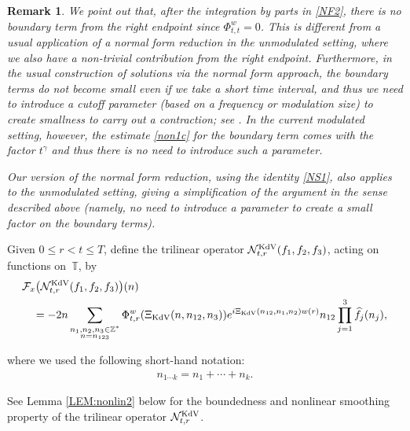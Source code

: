 \documentclass[letterpaper, 11pt,  reqno]{amsart}
\newtheorem{remark}[theorem]{Remark}
\newcommand{\1}{\hspace{0.5mm}\text{I}\hspace{0.5mm}}
\newcommand{\noi}{\noindent}
\newcommand{\Z}{\mathbb{Z}}
\newcommand{\T}{\mathbb{T}}
\newcommand{\F}{\mathcal{F}}
\newcommand{\g}{\gamma}
\newcommand{\ft}{\widehat}
\newcommand{\NN}{\mathcal{N}}
\newcommand{\KDV}{\text{\rm KdV} }
\numberwithin{equation}{section}
\numberwithin{theorem}{section}
\begin{document}
\begin{remark}\label{REM:NFx}
\rm
We point out 
that, after the integration by parts in \eqref{NF2},  there is 
no boundary term from the right endpoint  since $\Phi^w_{t, t} = 0$.
This  is different from a usual 
application of a
normal form reduction in the unmodulated setting, 
where we also have a non-trivial contribution from 
the right endpoint.
Furthermore, 
in the usual construction of solutions via the normal form approach, 
the boundary terms do not become small even if we take
a short time interval, 
and thus we need to introduce a cutoff parameter
(based on a frequency or modulation size)
to create smallness to carry out a contraction;
see \cite{BIT, KO, GKO}.
In the current modulated setting, however, 
the estimate \eqref{non1c} for the boundary term comes with the factor $t^\g$
and thus there is no need to introduce such a parameter.


Our version of the normal form reduction, 
using the identity \eqref{NS1}, 
also applies to the unmodulated setting, 
giving a simplification of the argument
in the sense described above
(namely, no need to introduce a parameter
to create a small factor on the boundary terms).



\end{remark}
	





Given $0 \le r <  t \le T$, 
define the trilinear operator $\NN^\KDV_{t, r}(f_1, f_2, f_3)$,  acting on functions on~$\T$, 
 by 
\begin{align}
\begin{split}
& \F_x\big(\NN^\KDV_{t, r}(f_1, f_2, f_3)\big)(n)\\
& \quad =   
- 2 n  \sum_{\substack{n_1, n_2, n_3 \in \Z^*\\n = n_{123}}}
 \Phi^w_{t, r}(\Xi_\KDV (n, n_{12}, n_3))
e^{i  \Xi_\KDV (n_{12}, n_1, n_2)w(r)}n_{12} 
\prod_{j = 1}^3\ft f_j(n_j), 
\end{split} 
\label{nox1}
\end{align}


\noi
where   we used the following short-hand notation:
\begin{align}
n_{1\cdots k} = n_1 + \cdots + n_k.
\label{no1}
\end{align}


\noi
See Lemma \ref{LEM:nonlin2} below
for the boundedness and nonlinear smoothing property
of the trilinear operator $\NN_{t, r}^\KDV$.
\end{document}
